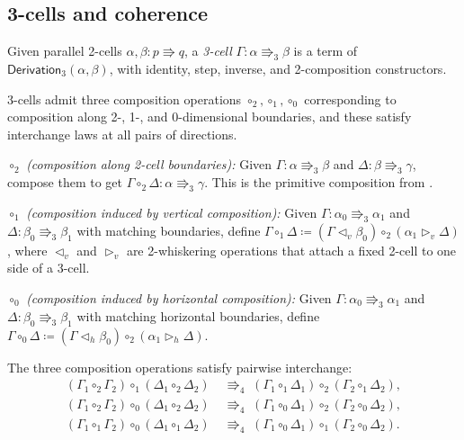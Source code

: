 \documentclass[manuscript]{BSLstyle}
\newcommand{\defeq}{\coloneqq}
\begin{document}
\subsection{3-cells and coherence}

\begin{definition}[3-cell]\label{def:3cell}
Given parallel 2-cells $\alpha, \beta : p \Rrightarrow q$, a
\emph{3-cell} $\Gamma : \alpha \Rrightarrow_3 \beta$ is a term of
$\mathsf{Derivation}_3(\alpha, \beta)$, with identity, step, inverse,
and 2-composition constructors.
\end{definition}

3-cells admit three composition operations $\circ_2, \circ_1, \circ_0$
corresponding to composition along 2-, 1-, and 0-dimensional boundaries,
and these satisfy interchange laws at all pairs of directions.

\emph{$\circ_2$ (composition along 2-cell boundaries):} Given
$\Gamma : \alpha \Rrightarrow_3 \beta$ and $\Delta : \beta \Rrightarrow_3 \gamma$,
compose them to get $\Gamma \circ_2 \Delta : \alpha \Rrightarrow_3 \gamma$.
This is the primitive composition from .

\emph{$\circ_1$ (composition induced by vertical composition):}
Given $\Gamma : \alpha_0 \Rrightarrow_3 \alpha_1$ and
$\Delta : \beta_0 \Rrightarrow_3 \beta_1$ with matching boundaries,
define $\Gamma \circ_1 \Delta \defeq
(\Gamma \triangleleft_v \beta_0) \circ_2 (\alpha_1 \triangleright_v \Delta)$,
where $\triangleleft_v$ and $\triangleright_v$ are 2-whiskering operations
that attach a fixed 2-cell to one side of a 3-cell.

\emph{$\circ_0$ (composition induced by horizontal composition):}
Given $\Gamma : \alpha_0 \Rrightarrow_3 \alpha_1$ and
$\Delta : \beta_0 \Rrightarrow_3 \beta_1$ with matching horizontal
boundaries, define $\Gamma \circ_0 \Delta \defeq
(\Gamma \triangleleft_h \beta_0) \circ_2 (\alpha_1 \triangleright_h \Delta)$.

\begin{theorem}\label{thm:interchange-3d}
The three composition operations satisfy pairwise interchange:
\begin{align*}
(\Gamma_1 \circ_2 \Gamma_2) \circ_1 (\Delta_1 \circ_2 \Delta_2)
  &\;\Rrightarrow_4\;
  (\Gamma_1 \circ_1 \Delta_1) \circ_2 (\Gamma_2 \circ_1 \Delta_2), \\
(\Gamma_1 \circ_2 \Gamma_2) \circ_0 (\Delta_1 \circ_2 \Delta_2)
  &\;\Rrightarrow_4\;
  (\Gamma_1 \circ_0 \Delta_1) \circ_2 (\Gamma_2 \circ_0 \Delta_2), \\
(\Gamma_1 \circ_1 \Gamma_2) \circ_0 (\Delta_1 \circ_1 \Delta_2)
  &\;\Rrightarrow_4\;
  (\Gamma_1 \circ_0 \Delta_1) \circ_1 (\Gamma_2 \circ_0 \Delta_2).
\end{align*}
\end{theorem}
\end{document}

